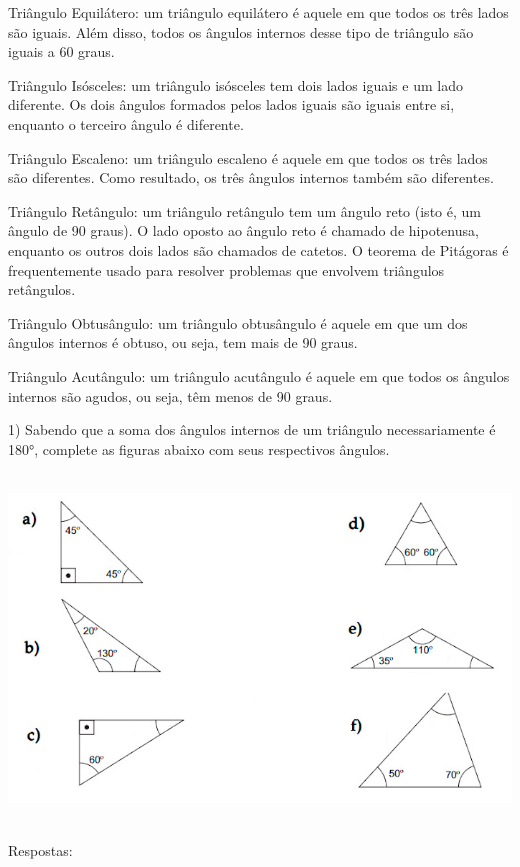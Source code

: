 Triângulo Equilátero: um triângulo equilátero é aquele em que todos os
três lados são iguais. Além disso, todos os ângulos internos desse tipo
de triângulo são iguais a 60 graus.

Triângulo Isósceles: um triângulo isósceles tem dois lados iguais e um
lado diferente. Os dois ângulos formados pelos lados iguais são iguais
entre si, enquanto o terceiro ângulo é diferente.

Triângulo Escaleno: um triângulo escaleno é aquele em que todos os três
lados são diferentes. Como resultado, os três ângulos internos também
são diferentes.

Triângulo Retângulo: um triângulo retângulo tem um ângulo reto (isto é,
um ângulo de 90 graus). O lado oposto ao ângulo reto é chamado de
hipotenusa, enquanto os outros dois lados são chamados de catetos. O
teorema de Pitágoras é frequentemente usado para resolver problemas que
envolvem triângulos retângulos.

Triângulo Obtusângulo: um triângulo obtusângulo é aquele em que um dos
ângulos internos é obtuso, ou seja, tem mais de 90 graus.

Triângulo Acutângulo: um triângulo acutângulo é aquele em que todos os
ângulos internos são agudos, ou seja, têm menos de 90 graus.


1) Sabendo que a soma dos ângulos internos de um triângulo
necessariamente é 180°, complete as figuras abaixo com seus respectivos
ângulos.

\includegraphics[width=5.90625in,height=3.63542in]{./imgSAEB_6_MAT/media/image52.png}

Respostas:

